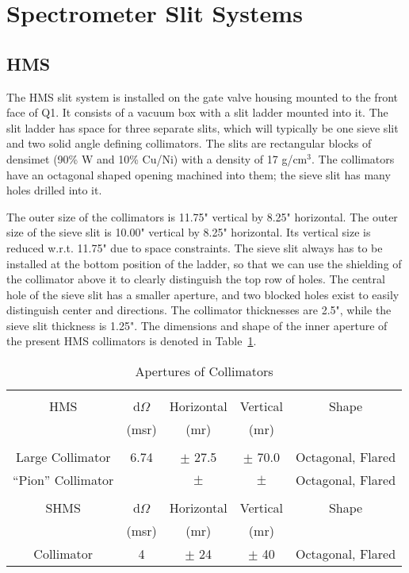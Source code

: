 \section{Spectrometer Slit Systems}
\label{sec:slit}

\subsection{HMS}
\label{sssec:hms_slit}
The HMS slit system is installed on the gate valve housing mounted to the
front face of Q1. It consists of a vacuum box with a slit ladder
mounted into it. The slit ladder has space for three separate slits,
which will typically be one sieve slit and two solid angle defining collimators.
The slits are rectangular blocks of densimet (90\% W and 10\% Cu/Ni)
with a density of 17 g/cm$^3$. The collimators have an octagonal shaped
opening machined into them; the sieve slit has many holes drilled
into it.

The outer size of the collimators is 11.75" vertical by 8.25"
horizontal. The outer size of the sieve slit is 10.00" vertical
by 8.25" horizontal.
Its vertical size is reduced w.r.t. 11.75" due to space constraints.
The sieve slit always has to be installed at the bottom position of the ladder,
so that we can use the shielding of the collimator above it to
clearly distinguish the top row of holes. The central hole
of the sieve slit has a smaller aperture, and two blocked holes
exist to easily distinguish center and directions.
The collimator thicknesses are 2.5", while the sieve slit thickness
is 1.25". The dimensions and shape of the inner aperture of the present
HMS collimators is denoted in Table~\ref{tab:apertures}.

\begin{table}
\begin{center}
\caption{Apertures of Collimators\label{tab:apertures}}
\begin{tabular}{|c|c|c|c|c|}
\hline
{} & {} & {} & {} & {} \\
HMS & d$\Omega$ & Horizontal & Vertical & Shape \\
{}  & (msr) 	& (mr) 	     & (mr) 	& {} 	\\
{} & {} & {} & {} & {} \\ \hline
Large Collimator  & 6.74 & $\pm$ 27.5 	& $\pm$ 70.0 	& Octagonal, Flared 	\\
``Pion'' Collimator&  	& $\pm$	& $\pm$  	& Octagonal, Flared 	\\
{} & {} & {} & {} & {} \\ \hline
SHMS	& d$\Omega$ 	& Horizontal 	& Vertical 		& Shape 	\\
{} 	& (msr) 	& (mr) 		& (mr) 		& {} 	\\
Collimator &   4         & $\pm$ 24      &  $\pm$ 40     & Octagonal, Flared \\
\hline
\end{tabular}
\end{center}
\end{table}

